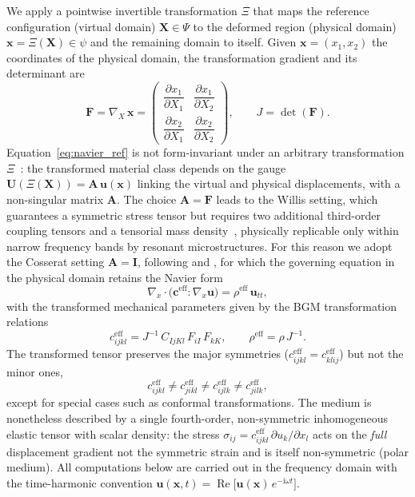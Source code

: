 \documentclass[preprint,12pt]{elsarticle}
\newcommand{\mbf}[1]{\mathbf{#1}}
\newcommand{\be}{\begin{equation}}
\newcommand{\ee}{\end{equation}}
\begin{document}
We apply a pointwise invertible transformation $\Xi$ that maps the
reference configuration (virtual domain) $\mbf{X}\in\Psi$ to the
deformed region (physical domain) $\mbf{x}=\Xi(\mbf{X})\in\psi$ and the
remaining domain to itself. Given $\mbf{x}=(x_1,x_2)$ the coordinates
of the physical domain, the transformation gradient and its determinant
are
\be\label{eq:Fgrad}
  \mbf{F} = \nabla_{\!X}\,\mbf{x}
  =
  \begin{pmatrix}
    \dfrac{\partial x_1}{\partial X_1} & \dfrac{\partial x_1}{\partial X_2} \\[2mm]
    \dfrac{\partial x_2}{\partial X_1} & \dfrac{\partial x_2}{\partial X_2}
  \end{pmatrix},
  \qquad
  J = \det(\mbf{F}).
\ee
Equation~\eqref{eq:navier_ref} is not form-invariant under an arbitrary
transformation $\Xi$~\citep{milton2006}: the transformed material class
depends on the gauge $\mbf{U}(\Xi(\mbf{X}))=\mbf{A}\,\mbf{u}(\mbf{x})$
linking the virtual and physical displacements, with  a
non-singular matrix $\mbf{A}$. The choice $\mbf{A}=\mbf{F}$ leads to the Willis
setting, which guarantees a symmetric stress tensor but requires two
additional third-order coupling tensors and a tensorial mass
density~\citep{milton2006,norris2011,willis1981}, physically replicable
only within narrow frequency bands by resonant microstructures. For
this reason we adopt the Cosserat setting $\mbf{A}=\mbf{I}$, following
\citet{norris2011} and \citet{brun2009}, for which the governing
equation in the physical domain retains the Navier form
\be\label{eq:navier}
  \nabla_{\!x}\cdot\bigl(\mbf{c}^{\mathrm{eff}}:\nabla_{\!x}\mbf{u}\bigr)
  = \rho^{\mathrm{eff}}\,\mbf{u}_{tt},
\ee
with the transformed mechanical parameters given by the BGM transformation relations
\be\label{eq:pushforward}
  c^{\mathrm{eff}}_{ijkl} = J^{-1}\,C_{IjKl}\,F_{iI}\,F_{kK},
  \qquad
  \rho^{\mathrm{eff}} = \rho\,J^{-1}.
\ee
The transformed tensor preserves the major symmetries
($c^{\mathrm{eff}}_{ijkl}=c^{\mathrm{eff}}_{klij}$) but not the minor
ones,
\be\label{eq:broken_minor}
  c^{\mathrm{eff}}_{ijkl}
  \neq c^{\mathrm{eff}}_{jikl}
  \neq c^{\mathrm{eff}}_{ijlk}
  \neq c^{\mathrm{eff}}_{jilk},
\ee
except for special cases such as conformal transformations. The medium
is nonetheless described by a single fourth-order, non-symmetric inhomogeneous elastic tensor with scalar density: the
stress $\sigma_{ij}=c^{\mathrm{eff}}_{ijkl}\,\partial u_k/\partial x_l$
acts on the \emph{full} displacement gradient not the symmetric
strain and is itself non-symmetric (polar medium). All computations
below are carried out in the frequency domain with the time-harmonic
convention
$\mbf{u}(\mbf{x},t)=\operatorname{Re}\bigl[\mbf{u}(\mbf{x})\,e^{-\mathrm{i}\omega t}\bigr]$.
\end{document}
